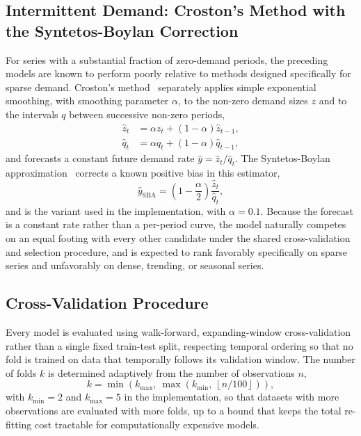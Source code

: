\subsection{Intermittent Demand: Croston's Method with the Syntetos-Boylan Correction}
For series with a substantial fraction of zero-demand periods, the preceding models are known to perform poorly relative to methods designed specifically for sparse demand. Croston's method~\cite{croston1972} separately applies simple exponential smoothing, with smoothing parameter $\alpha$, to the non-zero demand sizes $z$ and to the intervals $q$ between successive non-zero periods,
\begin{align}
\hat{z}_t &= \alpha z_t + (1-\alpha)\hat{z}_{t-1}, \label{eq:croston-size}\\
\hat{q}_t &= \alpha q_t + (1-\alpha)\hat{q}_{t-1}, \label{eq:croston-interval}
\end{align}
and forecasts a constant future demand rate $\hat{y} = \hat{z}_t / \hat{q}_t$. The Syntetos-Boylan approximation~\cite{syntetos2005sba} corrects a known positive bias in this estimator,
\begin{equation}
\label{eq:sba}
\hat{y}_{\text{SBA}} = \left(1 - \frac{\alpha}{2}\right)\frac{\hat{z}_t}{\hat{q}_t},
\end{equation}
and is the variant used in the implementation, with $\alpha=0.1$. Because the forecast is a constant rate rather than a per-period curve, the model naturally competes on an equal footing with every other candidate under the shared cross-validation and selection procedure, and is expected to rank favorably specifically on sparse series and unfavorably on dense, trending, or seasonal series.

\subsection{Cross-Validation Procedure}
\label{subsec:cv}
Every model is evaluated using walk-forward, expanding-window cross-validation~\cite{bergmeir2012cv} rather than a single fixed train-test split, respecting temporal ordering so that no fold is trained on data that temporally follows its validation window. The number of folds $k$ is determined adaptively from the number of observations $n$,
\begin{equation}
\label{eq:cv-folds}
k = \min\!\left(k_{\max},\ \max\!\left(k_{\min},\ \left\lfloor n/100\right\rfloor\right)\right),
\end{equation}
with $k_{\min}=2$ and $k_{\max}=5$ in the implementation, so that datasets with more observations are evaluated with more folds, up to a bound that keeps the total re-fitting cost tractable for computationally expensive models.

